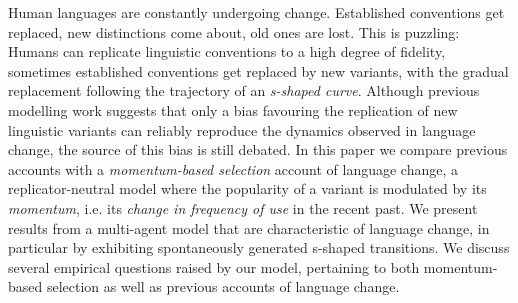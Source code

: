 Human languages are constantly undergoing change. Established conventions get replaced, new distinctions come about, old ones are lost.
This is puzzling:
Humans can replicate linguistic conventions to a high degree of fidelity, sometimes established conventions get replaced by new variants, with the gradual replacement following the trajectory of an \emph{s-shaped curve}. Although previous modelling work suggests that only a bias favouring the replication of new linguistic variants can reliably reproduce the dynamics observed in language change, the source of this bias is still debated. In this paper we compare previous accounts with a \emph{momentum-based selection} account of language change, a replicator-neutral model where the popularity of a variant is modulated by its \emph{momentum}, i.e. its \emph{change in frequency of use} in the recent past. We present results from a multi-agent model that are characteristic of language change, in particular by exhibiting spontaneously generated s-shaped transitions. We discuss several empirical questions raised by our model, pertaining to both momentum-based selection as well as previous accounts of language change.
